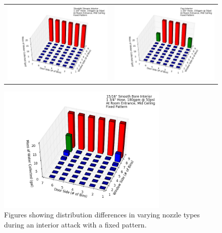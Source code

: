 \documentclass{article}
\begin{document}
\begin{figure}[ht]
\begin{tabular*}{\textwidth}{lr}
\includegraphics[width=3.2in]{../ADD_Analysis/Figures/15-12-09_121955_Datafile_Straight_Stream_Interior.png} &
\includegraphics[width=3.2in]{../ADD_Analysis/Figures/15-12-09_123142_Datafile_Fog_Interior.png} \\
\end{tabular*}
\centering
\includegraphics[width=3.2in]{../ADD_Analysis/Figures/15-12-09_144839_Datafile_15_16in_Smooth_Bore_Interior.png}
\caption{Figures showing distribution differences in varying nozzle types during an interior attack with a fixed pattern.}
\label{fig:Interior_Varying_Nozzle_Types_Fixed_Pattern}
\end{figure}
\end{document}
